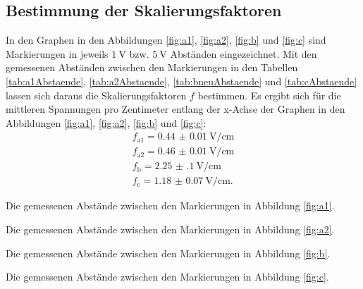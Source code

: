 \subsection{Bestimmung der Skalierungsfaktoren}
In den Graphen in den Abbildungen \ref{fig:a1}, \ref{fig:a2}, \ref{fig:b} und \ref{fig:c} sind Markierungen in jeweils $\SI{1}{\volt}$ bzw. $\SI{5}{\volt}$ Abständen eingezeichnet.
Mit den gemessenen Abständen zwischen den Markierungen in den Tabellen \ref{tab:a1Abstaende}, \ref{tab:a2Abstaende}, \ref{tab:bneuAbstaende} und \ref{tab:cAbstaende} lassen sich daraus die Skalierungsfaktoren $f$ bestimmen.
Es ergibt sich für die mittleren Spannungen pro Zentimeter entlang der x-Achse der Graphen in den Abbildungen \ref{fig:a1}, \ref{fig:a2}, \ref{fig:b} und \ref{fig:c}:
\begin{gather*}
f_\text{a1}=\SI{0.44(1)}{\volt\per\centi\meter}\\
f_\text{a2}=\SI{0.46(1)}{\volt\per\centi\meter}\\
f_\text{b}=\SI{2.25(10)}{\volt\per\centi\meter}\\
f_\text{c}=\SI{1.18(7)}{\volt\per\centi\meter}\text{.}
\end{gather*}
\begin{center}
	\begin{table}
		\begin{minipage}[t]{0.5\textwidth}
			\setcapwidth[c]{\textwidth}%
			\caption{Die gemessenen Abstände zwischen den Markierungen in Abbildung \ref{fig:a1}.}
			\centering
			
		\end{minipage}
		\begin{minipage}[t]{0.5\textwidth}
			\setcapwidth[c]{\textwidth}%
			\caption{Die gemessenen Abstände zwischen den Markierungen in Abbildung \ref{fig:a2}.}
			\centering
			
		\end{minipage}
	\end{table}
\end{center}
\begin{center}
	\begin{table}
		\begin{minipage}[t]{0.5\textwidth}
			\setcapwidth[c]{\textwidth}%
			\caption{Die gemessenen Abstände zwischen den Markierungen in Abbildung \ref{fig:b}.}
			\centering
			
		\end{minipage}
		\begin{minipage}[t]{0.5\textwidth}
			\setcapwidth[c]{\textwidth}%
			\caption{Die gemessenen Abstände zwischen den Markierungen in Abbildung \ref{fig:c}.}
			\centering
			
		\end{minipage}
	\end{table}
\end{center}



